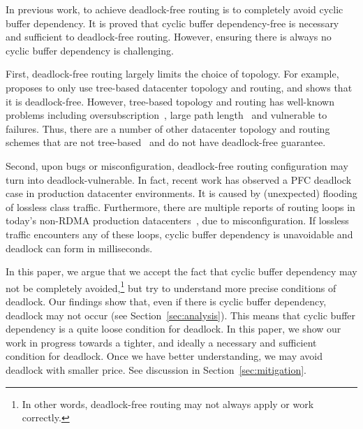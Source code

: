 In previous work, to achieve deadlock-free routing is to completely avoid cyclic buffer dependency.
It is proved that cyclic buffer dependency-free is necessary and sufficient to deadlock-free routing.
However, ensuring there is always no cyclic buffer dependency is challenging.

First, deadlock-free routing largely limits the choice of topology. For example, \cite{tcpbolt}
proposes to only use tree-based datacenter topology and routing, and shows that it is deadlock-free. 
However, tree-based topology and routing has well-known problems including oversubscription~\cite{fattree},
large path length~\cite{jellyfish} and vulnerable to failures.
Thus, there are a number of other datacenter topology and routing schemes that are not 
tree-based~\cite{bcube, camcube, jellyfish} and do not have deadlock-free guarantee. 

Second, upon bugs or misconfiguration, deadlock-free routing configuration may turn into
deadlock-vulnerable. In fact, recent work has observed a PFC deadlock case in production
datacenter environments\cite{rdmascale}. It is caused by (unexpected) flooding of 
lossless class traffic. Furthermore, there are multiple reports of routing loops in today's non-RDMA
production datacenters~\cite{everflow, libra}, due to misconfiguration. If lossless traffic encounters
any of these loops, cyclic buffer dependency is unavoidable and deadlock can form in milliseconds.

In this paper, we argue that we accept the fact that cyclic buffer dependency may not be completely 
avoided,\footnote{In other words, deadlock-free routing may not always apply or work correctly.}
but try to understand more precise conditions of deadlock. Our findings show that,
even if there is cyclic buffer dependency, deadlock may not occur (see Section~\ref{sec:analysis}).
This means that cyclic buffer dependency is a quite loose condition for deadlock.
In this paper, we show our work in progress towards a tighter, and ideally a necessary and sufficient 
condition for deadlock. Once we have better understanding, we may avoid deadlock with smaller price. 
See discussion in Section~\ref{sec:mitigation}.


